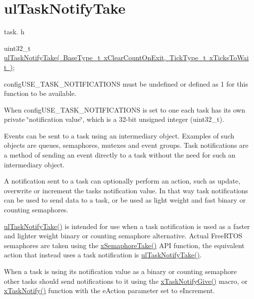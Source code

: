 \hypertarget{group__ul_task_notify_take}{}\section{ul\+Task\+Notify\+Take}
\label{group__ul_task_notify_take}
task. h 
\begin{DoxyPre}uint32\_t \mbox{\hyperlink{task_8h_a66540bef602522a01a519f776e4c07d8}{ulTaskNotifyTake( BaseType\_t xClearCountOnExit, TickType\_t xTicksToWait )}};\end{DoxyPre}


config\+U\+S\+E\+\_\+\+T\+A\+S\+K\+\_\+\+N\+O\+T\+I\+F\+I\+C\+A\+T\+I\+O\+NS must be undefined or defined as 1 for this function to be available.

When config\+U\+S\+E\+\_\+\+T\+A\+S\+K\+\_\+\+N\+O\+T\+I\+F\+I\+C\+A\+T\+I\+O\+NS is set to one each task has its own private \char`\"{}notification value\char`\"{}, which is a 32-\/bit unsigned integer (uint32\+\_\+t).

Events can be sent to a task using an intermediary object. Examples of such objects are queues, semaphores, mutexes and event groups. Task notifications are a method of sending an event directly to a task without the need for such an intermediary object.

A notification sent to a task can optionally perform an action, such as update, overwrite or increment the task\textquotesingle{}s notification value. In that way task notifications can be used to send data to a task, or be used as light weight and fast binary or counting semaphores.

\mbox{\hyperlink{task_8h_a66540bef602522a01a519f776e4c07d8}{ul\+Task\+Notify\+Take()}} is intended for use when a task notification is used as a faster and lighter weight binary or counting semaphore alternative. Actual Free\+R\+T\+OS semaphores are taken using the \mbox{\hyperlink{semphr_8h_af116e436d2a5ae5bd72dbade2b5ea930}{x\+Semaphore\+Take()}} A\+PI function, the equivalent action that instead uses a task notification is \mbox{\hyperlink{task_8h_a66540bef602522a01a519f776e4c07d8}{ul\+Task\+Notify\+Take()}}.

When a task is using its notification value as a binary or counting semaphore other tasks should send notifications to it using the \mbox{\hyperlink{task_8h_ac60cbd05577a3e4f3c3587dd9b213930}{x\+Task\+Notify\+Give()}} macro, or \mbox{\hyperlink{task_8h_a0d2d54fb8a64011dfbb54983e4ed06bd}{x\+Task\+Notify()}} function with the e\+Action parameter set to e\+Increment.

